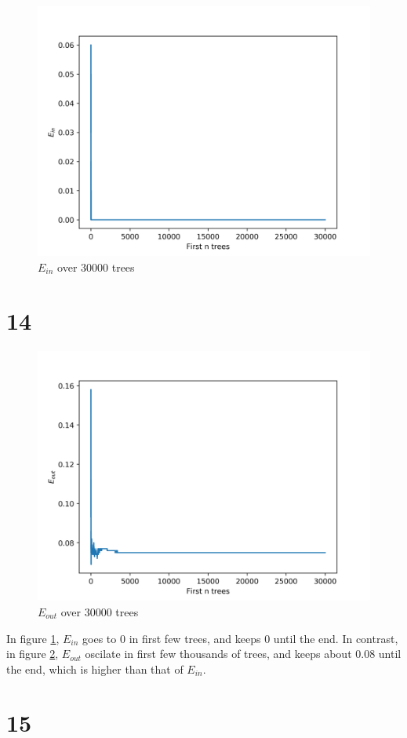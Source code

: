 \documentclass[fleqn,a4paper,12pt]{article}
\begin{document}
\begin{figure}[H]
\centering
\includegraphics[width=0.75\linewidth]{tree-ein.png}
\caption{$E_{in}$ over 30000 trees}
\label{fig:tree-ein}
\end{figure}

\section*{14}

\begin{figure}[H]
\centering
\includegraphics[width=0.75\linewidth]{tree-eout.png}
\caption{$E_{out}$ over 30000 trees}
\label{fig:tree-eout}
\end{figure}

In figure \ref{fig:tree-ein}, $E_{in}$ goes to $0$ in first few trees, and keeps $0$ until the end. In contrast, in figure \ref{fig:tree-eout}, $E_{out}$ oscilate in first few thousands of trees, and keeps about $0.08$ until the end, which is higher than that of $E_{in}$.

\section*{15}
\end{document}
